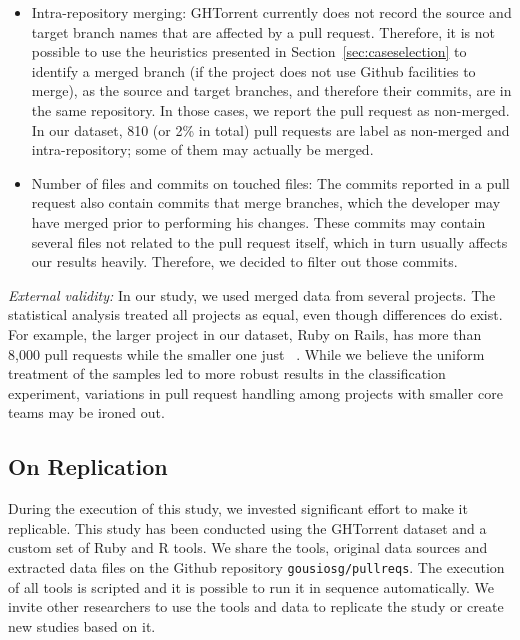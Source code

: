 \documentclass{sig-alternate}
\begin{document}
\begin{itemize}

  \item Intra-repository merging: GHTorrent currently does not record the source
    and target branch names that are affected by a pull request. Therefore, it
    is not possible to use the heuristics presented in
    Section~\ref{sec:caseselection} to identify a merged branch (if the project
    does not use Github facilities to merge), as the source and target branches,
    and therefore their commits, are in the same repository. In those cases, we
    report the pull request as non-merged. In our dataset, 810 (or 2\% in total)
    pull requests are label as non-merged and intra-repository; some of them may
    actually be merged.

  \item Number of files and commits on touched files: The commits reported
    in a pull request also contain commits that merge branches, which the
    developer may have merged prior to performing his changes. These commits
    may contain several files not related to the pull request itself, which
    in turn usually affects our results heavily. Therefore, we decided to 
    filter out those commits.

\end{itemize}

\noindent\emph{External validity:}
In our study, we used merged data from several projects. The statistical
analysis treated all projects as equal, even though differences do exist.
For example, the larger project in our dataset, Ruby on Rails, 
has more than 8,000 pull requests while the smaller one just ~.
While we believe the uniform treatment of the samples led to more robust
results in the classification experiment, variations in pull request
handling among projects with smaller core teams may be ironed out.

\subsection{On Replication}

During the execution of this study, we invested significant effort to
make it replicable.  This study has been conducted using the GHTorrent dataset
and a custom set of Ruby and R tools. We share the tools, original data sources
and extracted data files on the Github repository \texttt{gousiosg/pullreqs}.
The execution of all tools is scripted and it is possible to run it
in sequence automatically. We invite other researchers to use the tools and data
to replicate the study or create new studies based on it.
\end{document}
